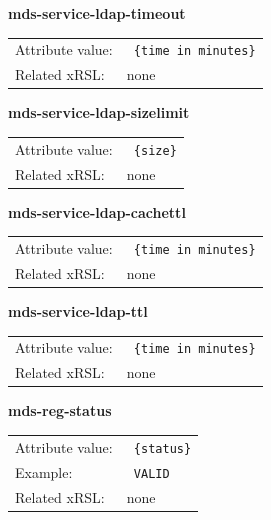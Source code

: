 \documentclass{article}
\begin{document}
  \hspace*{0.5cm}
  \begin{shaded}
    \textbf{mds-service-ldap-timeout}
  \end{shaded}
  \begin{tabular}{lp{10cm}}  
    Attribute value:&\verb# {time in minutes}#\\
    Related xRSL:&none \\
  \end{tabular}

  \hspace*{0.5cm}
  \begin{shaded}
    \textbf{mds-service-ldap-sizelimit}
  \end{shaded}
  \begin{tabular}{lp{10cm}}  
    Attribute value:&\verb# {size}#\\
    Related xRSL:&none \\
  \end{tabular}

  \hspace*{0.5cm}
  \begin{shaded}
    \textbf{mds-service-ldap-cachettl}
  \end{shaded}
  \begin{tabular}{lp{10cm}}  
    Attribute value:&\verb# {time in minutes}#\\
    Related xRSL:&none \\
  \end{tabular}

  \hspace*{0.5cm}
  \begin{shaded}
    \textbf{mds-service-ldap-ttl}
  \end{shaded}
  \begin{tabular}{lp{10cm}}  
    Attribute value:&\verb# {time in minutes}#\\
    Related xRSL:&none \\
  \end{tabular}

  \hspace*{0.5cm}
  \begin{shaded}
    \textbf{mds-reg-status}
  \end{shaded}
  \begin{tabular}{lp{10cm}}  
    Attribute value:&\verb# {status}#\\
    Example: &\verb# VALID #\\
    Related xRSL:&none \\
  \end{tabular}
\end{document}
